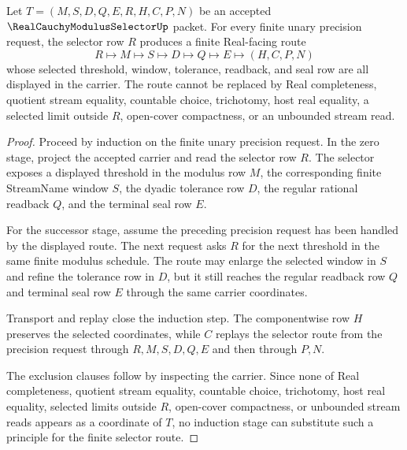 \begin{theorem}
\label{thm:real-cauchy-modulus-selector-finite-window-soundness}
Let $T=(M,S,D,Q,E,R,H,C,P,N)$ be an accepted $\RealCauchyModulusSelectorUp$ packet. For every finite unary precision request, the selector row $R$ produces a finite Real-facing route
$$
R\longmapsto M\longmapsto S\longmapsto D\longmapsto Q\longmapsto E\longmapsto(H,C,P,N)
$$
whose selected threshold, window, tolerance, readback, and seal row are all displayed in the carrier. The route cannot be replaced by Real completeness, quotient stream equality, countable choice, trichotomy, host real equality, a selected limit outside $R$, open-cover compactness, or an unbounded stream read.
\end{theorem}
\begin{proof}
Proceed by induction on the finite unary precision request. In the zero stage, project the accepted carrier and read the selector row $R$. The selector exposes a displayed threshold in the modulus row $M$, the corresponding finite StreamName window $S$, the dyadic tolerance row $D$, the regular rational readback $Q$, and the terminal seal row $E$.

For the successor stage, assume the preceding precision request has been handled by the displayed route. The next request asks $R$ for the next threshold in the same finite modulus schedule. The route may enlarge the selected window in $S$ and refine the tolerance row in $D$, but it still reaches the regular readback row $Q$ and terminal seal row $E$ through the same carrier coordinates.

Transport and replay close the induction step. The componentwise row $H$ preserves the selected coordinates, while $C$ replays the selector route from the precision request through $R,M,S,D,Q,E$ and then through $P,N$.

The exclusion clauses follow by inspecting the carrier. Since none of Real completeness, quotient stream equality, countable choice, trichotomy, host real equality, selected limits outside $R$, open-cover compactness, or unbounded stream reads appears as a coordinate of $T$, no induction stage can substitute such a principle for the finite selector route.
\end{proof}

